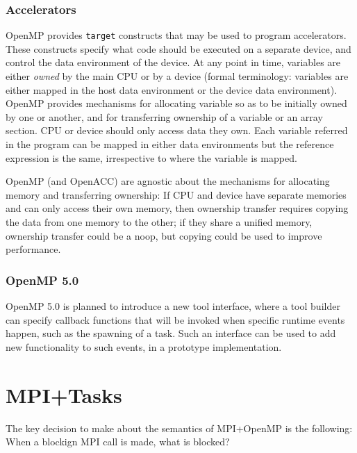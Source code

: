 \documentclass[twoside,11pt]{article}
\begin{document}
	\subsubsection{Accelerators}
	OpenMP provides \texttt{target} constructs that may be used to program 
	accelerators. These constructs specify what code should be executed on a 
	separate device, and control the data environment of the device. At any 
	point in time, variables are either \emph{owned} by the main CPU or by a 
	device (formal terminology: variables are either mapped in the host data 
	environment or the device data environment). OpenMP provides mechanisms for 
	allocating variable so as to be initially
	owned by one or another, and for transferring ownership of a variable or an 
	array section. CPU or device should only access data they own. Each 
	variable referred in the program can be mapped in either data environments 
	but the reference expression is the same, irrespective to where the 
	variable is mapped.
	
	OpenMP (and OpenACC) are agnostic about the mechanisms for allocating 
	memory and transferring ownership: If CPU and device have separate memories 
	and can only access their own memory, then ownership transfer requires 
	copying 
	the data from one memory to the other; if they share a unified memory, 
	ownership transfer could be a 
	noop, but copying could be used to improve performance.
	
	\subsubsection{OpenMP 5.0}
	
	OpenMP 5.0 is planned to introduce a new tool interface, where a tool 
	builder can specify callback functions that will be invoked when specific 
	runtime events happen, such as the spawning of a task. Such an interface 
	can be used to add new functionality to such events, in a prototype 
	implementation.
	
	\section{MPI+Tasks}
		The key decision to make about the semantics of MPI+OpenMP is the 
	following: When a blockign MPI call is made, what is blocked?
	
\end{document}
